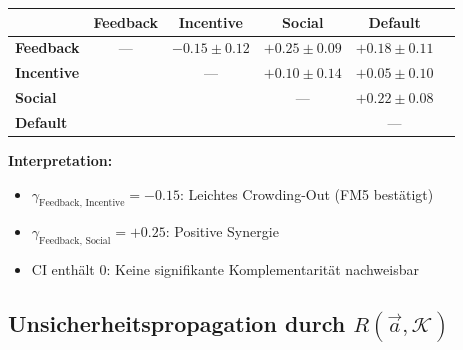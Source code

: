\begin{tcolorbox}[colback=green!5!white, colframe=green!75!black,
    title=\textbf{LLMMC-geschätzte $\gamma$-Matrix für Interventionspaare}]

\renewcommand{\arraystretch}{1.2}
\begin{center}
\begin{tabular}{@{}lccccc@{}}
\toprule
& \textbf{Feedback} & \textbf{Incentive} & \textbf{Social} & \textbf{Default} \\
\midrule
\textbf{Feedback} & --- & $-0.15 \pm 0.12$ & $+0.25 \pm 0.09$ & $+0.18 \pm 0.11$ \\
\textbf{Incentive} & & --- & $+0.10 \pm 0.14$ & $+0.05 \pm 0.10$ \\
\textbf{Social} & & & --- & $+0.22 \pm 0.08$ \\
\textbf{Default} & & & & --- \\
\bottomrule
\end{tabular}
\end{center}

\textbf{Interpretation:}
\begin{itemize}[nosep]
    \item $\gamma_{\text{Feedback, Incentive}} = -0.15$: Leichtes Crowding-Out (FM5 bestätigt)
    \item $\gamma_{\text{Feedback, Social}} = +0.25$: Positive Synergie
    \item CI enthält 0: Keine signifikante Komplementarität nachweisbar
\end{itemize}

\end{tcolorbox}

\subsection{Unsicherheitspropagation durch $R(\vec{a}, \mathcal{K})$}

